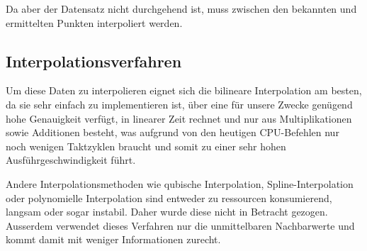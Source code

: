 Da aber der Datensatz nicht durchgehend ist, muss zwischen den bekannten
und ermittelten Punkten interpoliert werden.

\subsection{Interpolationsverfahren}
Um diese Daten zu interpolieren eignet sich die bilineare Interpolation
am besten, da sie sehr einfach zu implementieren ist, über eine für
unsere Zwecke genügend hohe Genauigkeit verfügt, in linearer Zeit
rechnet und nur aus Multiplikationen sowie Additionen besteht, was
aufgrund von den heutigen CPU-Befehlen nur noch wenigen Taktzyklen
braucht und somit zu einer sehr hohen Ausführgeschwindigkeit führt.

Andere Interpolationsmethoden wie qubische Interpolation,
Spline-Interpolation oder polynomielle Interpolation sind entweder zu
ressourcen konsumierend, langsam oder sogar instabil. Daher wurde diese
nicht in Betracht gezogen. Ausserdem verwendet dieses Verfahren nur die
unmittelbaren Nachbarwerte und kommt damit mit weniger Informationen
zurecht.
